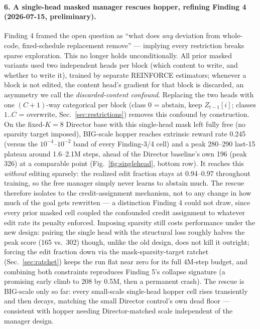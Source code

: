 \documentclass[10pt]{article}
\begin{document}
\paragraph{6. A single-head masked manager rescues hopper, refining Finding 4
(2026-07-15, preliminary).} Finding 4 framed the open question as ``what does
\emph{any} deviation from whole-code, fixed-schedule replacement remove'' ---
implying every restriction breaks sparse exploration. This no longer holds
unconditionally. All prior masked variants used two independent heads per
block (which content to write, and whether to write it), trained by separate
REINFORCE estimators; whenever a block is not edited, the content head's
gradient for that block is discarded, an asymmetry we call the
\emph{discarded-content confound}. Replacing the two heads with one
$(C{+}1)$-way categorical per block (class 0 = abstain, keep $Z_{t-1}[i]$;
classes $1..C$ = overwrite, Sec.~\ref{sec:restrictions}) removes this confound by
construction. On the fixed-$K{=}8$ Director base with this single-head mask
left fully free (no sparsity target imposed), BIG-scale hopper reaches
extrinsic reward rate 0.245 (versus the $10^{-4}$--$10^{-2}$ band of every
Finding-3/4 cell) and a peak 280--290 last-15 plateau around 1.6--2.1M steps,
ahead of the Director baseline's own 196 (peak 326) at a comparable point
(Fig.~\ref{fig:singlehead}, bottom row). It reaches this \emph{without}
editing sparsely: the realized edit fraction stays at 0.94--0.97 throughout
training, so the free manager simply never learns to abstain much. The
rescue therefore isolates to the credit-assignment mechanism, not to any
change in how much of the goal gets rewritten --- a distinction Finding 4
could not draw, since every prior masked cell coupled the confounded credit
assignment to whatever edit rate its penalty enforced. Imposing sparsity
still costs performance under the new design: pairing the single head with
the structural loss roughly halves the peak score (165 vs.\ 302) though,
unlike the old design, does not kill it outright; forcing the edit fraction
down via the mask-sparsity-target ratchet (Sec.~\ref{sec:ratchet}) keeps the
run flat near zero for its full 4M-step budget, and combining both
constraints reproduces Finding 5's collapse signature (a promising early
climb to 208 by 0.5M, then a permanent crash). The rescue is BIG-scale only
so far: every small-scale single-head hopper cell rises transiently and then
decays, matching the small Director control's own dead floor --- consistent
with hopper needing Director-matched scale independent of the manager
design.
\end{document}
